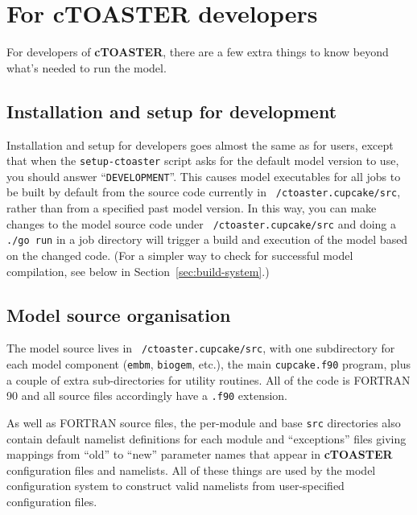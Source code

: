 \documentclass[a4paper,10pt,article]{memoir}
\begin{document}
\chapter{For cTOASTER developers}
\label{sec:genie-devs}

For developers of \textbf{cTOASTER}, there are a few extra things to know beyond
what's needed to run the model.

\section{Installation and setup for development}

Installation and setup for developers goes almost the same as for
users, except that when the \texttt{setup-ctoaster} script asks for the
default model version to use, you should answer
``\texttt{DEVELOPMENT}''.  This causes model executables for all jobs
to be built by default from the source code currently in
\texttt{~/ctoaster.cupcake/src}, rather than from a specified past model
version.  In this way, you can make changes to the model source code
under \texttt{~/ctoaster.cupcake/src} and doing a \texttt{./go run} in a job
directory will trigger a build and execution of the model based on the
changed code.  (For a simpler way to check for successful model
compilation, see below in Section~\ref{sec:build-system}.)

\section{Model source organisation}

The model source lives in \texttt{~/ctoaster.cupcake/src}, with one subdirectory
for each model component (\texttt{embm}, \texttt{biogem}, etc.), the
main \texttt{cupcake.f90} program, plus a couple of extra sub-directories
for utility routines.  All of the code is FORTRAN 90 and all source
files accordingly have a \texttt{.f90} extension.

As well as FORTRAN source files, the per-module and base \texttt{src}
directories also contain default namelist definitions for each module
and ``exceptions'' files giving mappings from ``old'' to ``new''
parameter names that appear in \textbf{cTOASTER} configuration files and
namelists.  All of these things are used by the model configuration
system to construct valid namelists from user-specified configuration
files.
\end{document}
